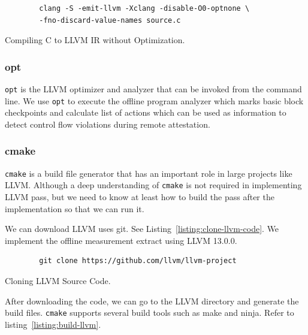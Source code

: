 \begin{listing}[htbp]
    \begin{verbatim}
        clang -S -emit-llvm -Xclang -disable-O0-optnone \
        -fno-discard-value-names source.c
    \end{verbatim}
    \caption{Compiling C to LLVM IR without Optimization.}    
    \label{listing:compile-llvm-to-ir-no-opt}
\end{listing}

\subsubsection{opt}

\texttt{opt} is the LLVM optimizer and analyzer that can be invoked from the
command line. We use \texttt{opt} to execute the offline program analyzer which
marks basic block checkpoints and calculate list of actions which can be used as
information to detect control flow violations during remote attestation.

\subsubsection{cmake}

\texttt{cmake} is a build file generator that has an important role in large
projects like LLVM. Although a deep understanding of \texttt{cmake} is not
required in implementing LLVM pass, but we need to know at least how to build
the pass after the implementation so that we can run it.

We can download LLVM uses git. See Listing~\ref{listing:clone-llvm-code}. We
implement the offline measurement extract using LLVM 13.0.0.

\begin{listing}[htbp]
    \begin{verbatim}
        git clone https://github.com/llvm/llvm-project
    \end{verbatim}
    \caption{Cloning LLVM Source Code.}    
    \label{listing:clone-llvm-code}
\end{listing}

After downloading the code, we can go to the LLVM directory and generate the
build files. \texttt{cmake} supports several build tools such as make and ninja.
Refer to listing~\ref{listing:build-llvm}.

